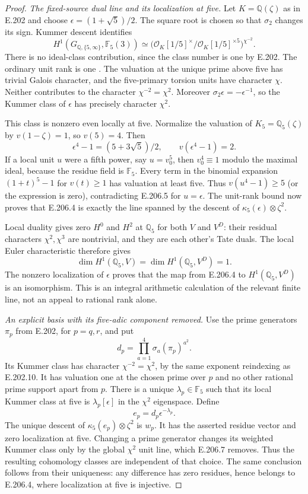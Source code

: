 \begin{proof}
\emph{The fixed-source dual line and its localization at five.}
Let $K=\mathbb Q(\zeta)$ as in E.202 and choose
$\epsilon=(1+\sqrt5)/2$.  The square root is chosen so that
$\sigma_2$ changes its sign.  Kummer descent identifies
\[
 H^1(G_{\mathbb Q,\{5,\infty\}},\mathbb F_5(3))
 \simeq
 \bigl(\mathcal O_K[1/5]^\times/
              \mathcal O_K[1/5]^{\times5}\bigr)^{\chi^{-2}}.
 \tag{E.206.4}
\]
There is no ideal-class contribution, since the class number is one
by E.202.  The ordinary unit rank is one
\citep[Theorem5.1, p.~85]{MilneANT2020}.  The valuation at the
unique prime above five has trivial Galois character, and the
five-primary torsion units have character $\chi$.  Neither
contributes to the character $\chi^{-2}=\chi^2$.
Moreover $\sigma_2\epsilon=-\epsilon^{-1}$, so the Kummer
class of $\epsilon$ has precisely character $\chi^2$.

This class is nonzero even locally at five.  Normalize the valuation
of $K_5=\mathbb Q_5(\zeta)$ by $v(1-\zeta)=1$, so $v(5)=4$.
Then
\[
 \epsilon^4-1=(5+3\sqrt5)/2,\qquad v(\epsilon^4-1)=2.
 \tag{E.206.5}
\]
If a local unit $u$ were a fifth power, say $u=v_0^5$, then
$v_0^4\equiv1$ modulo the maximal ideal, because the residue
field is $\mathbb F_5$.  Every term in the binomial expansion
$(1+t)^5-1$ for $v(t)\ge1$ has valuation at least five.
Thus $v(u^4-1)\ge5$ (or the expression is zero), contradicting
E.206.5 for $u=\epsilon$.
The unit-rank bound now proves that E.206.4 is exactly the line
spanned by the descent of $\kappa_5(\epsilon)\otimes\zeta^2$.

Local duality gives zero $H^0$ and $H^2$ at $\mathbb Q_5$ for
both $V$ and $V^D$: their residual characters $\chi^2,\chi^3$
are nontrivial, and they are each other's Tate duals.
The local Euler characteristic
\citep[I.2.8, p.~31]{CohMilneADT} therefore gives
\[
 \dim H^1(\mathbb Q_5,V)=\dim H^1(\mathbb Q_5,V^D)=1.
\]
The nonzero localization of $\epsilon$ proves that the map
from E.206.4 to $H^1(\mathbb Q_5,V^D)$ is an isomorphism.
This is an integral arithmetic calculation of the relevant
finite line, not an appeal to rational rank alone.

\emph{An explicit basis with its five-adic component removed.}
Use the prime generators $\pi_p$ from E.202, for $p=q,r$, and put
\[
 d_p=\prod_{a=1}^4\sigma_a(\pi_p)^{a^2}.
 \tag{E.206.6}
\]
Its Kummer class has character $\chi^{-2}=\chi^2$, by the
same exponent reindexing as E.202.10.  It has valuation one at
the chosen prime over $p$ and no other rational prime support
apart from $p$.  There is a unique $\lambda_p\in\mathbb F_5$
such that its local Kummer class at five is
$\lambda_p[\epsilon]$ in the $\chi^2$ eigenspace.  Define
\[
                    e_p=d_p\epsilon^{-\lambda_p}.
 \tag{E.206.7}
\]
The unique descent of $\kappa_5(e_p)\otimes\zeta^2$ is $w_p$.
It has the asserted residue vector and zero localization at five.
Changing a prime generator changes its weighted Kummer class
only by the global $\chi^2$ unit line, which E.206.7 removes.
Thus the resulting cohomology classes are independent of that
choice.  The same conclusion follows from their uniqueness:
any difference has zero residues, hence belongs to E.206.4,
where localization at five is injective.


\end{proof}
